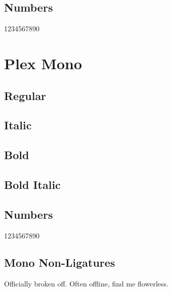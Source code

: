 \documentclass{article}
\begin{document}
\textbf{\textit{\lipsum[4]}}

\subsection*{Numbers}

1234567890

\clearpage
\section*{Plex Mono}

\ttfamily

\subsection*{Regular}
\lipsum[1]

\subsection*{Italic}
\textit{\lipsum[2]}

\subsection*{Bold}

\textbf{\lipsum[3]}



\subsection*{Bold Italic}

\textbf{\textit{\lipsum[4]}}

\subsection*{Numbers}

1234567890

\subsection*{Mono Non-Ligatures}


Officially broken off. Often offline, find me flowerless.
\end{document}
